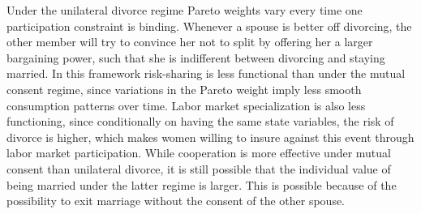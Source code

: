 \documentclass[12pt]{article}
\numberwithin{table}{section}
\begin{document}
Under the unilateral divorce regime Pareto weights vary every time one participation constraint is binding. Whenever a spouse is better off divorcing, the other member will try to convince her not to split by offering her a larger bargaining power, such that she is indifferent between divorcing and staying married. In this framework risk-sharing is less functional than under the mutual consent regime, since variations in the Pareto weight imply less smooth consumption patterns over time. Labor market specialization is also less functioning, since conditionally on having the same state variables, the risk of divorce is higher, which makes women willing to insure against this event through labor market participation. While cooperation is more effective under mutual consent than unilateral divorce, it is still possible that the individual value of being married under the latter regime is larger. This is possible because of the possibility to exit marriage without the consent of the other spouse.

\end{document}
